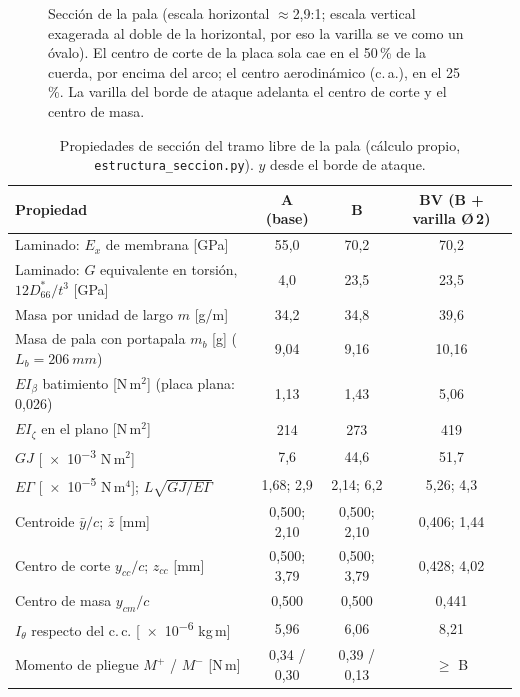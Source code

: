 \begin{figure}[H]
\caption{Sección de la pala (escala horizontal $\approx$2,9:1; escala vertical exagerada al
doble de la horizontal, por eso la varilla se ve como un óvalo).
El centro de corte de la placa sola cae en el 50\,\% de la cuerda, por encima del arco;
el centro aerodinámico (c.\,a.), en el 25\,\%. La varilla del borde de ataque adelanta el
centro de corte y el centro de masa.}
\label{fig:estructura-seccion}
\end{figure}

\begin{table}[H]
\centering\small
\caption[Propiedades de sección del tramo libre de la pala]{Propiedades de sección del tramo libre de la pala (cálculo propio,
\texttt{estructura\_seccion.py}). $y$ desde el borde de ataque.}\label{tab:estructura-seccion}
\begin{tabular}{@{}lccc@{}}
\toprule
\textbf{Propiedad} & \textbf{A (base)} & \textbf{B} & \textbf{BV (B + varilla Ø\,2)}\\\midrule
Laminado: $E_x$ de membrana [GPa]            & 55,0 & 70,2 & 70,2\\
Laminado: $G$ equivalente en torsión, $12D_{66}^*/t^3$ [GPa] & 4,0 & 23,5 & 23,5\\
Masa por unidad de largo $m$ [g/m]           & 34,2 & 34,8 & 39,6\\
Masa de pala con portapala $m_b$ [g] ($L_b=\SI{206}{mm}$) & 9,04 & 9,16 & 10,16\\
$EI_\beta$ batimiento [N\,m$^2$] (placa plana: 0,026) & 1,13 & 1,43 & 5,06\\
$EI_\zeta$ en el plano [N\,m$^2$]             & 214 & 273 & 419\\
$GJ$ [\num{e-3} N\,m$^2$]                     & 7,6 & 44,6 & 51,7\\
$E\Gamma$ [\num{e-5} N\,m$^4$]; $L\sqrt{GJ/E\Gamma}$ & 1,68; 2,9 & 2,14; 6,2 & 5,26; 4,3\\
Centroide $\bar y/c$; $\bar z$ [mm]            & 0,500; 2,10 & 0,500; 2,10 & 0,406; 1,44\\
Centro de corte $y_{cc}/c$; $z_{cc}$ [mm]      & 0,500; 3,79 & 0,500; 3,79 & 0,428; 4,02\\
Centro de masa $y_{cm}/c$                      & 0,500 & 0,500 & 0,441\\
$I_\theta$ respecto del c.\,c. [\num{e-6} kg\,m] & 5,96 & 6,06 & 8,21\\
Momento de pliegue $M^+$ / $M^-$ [N\,m]         & 0,34 / 0,30 & 0,39 / 0,13 & $\ge$ B\\
\bottomrule
\end{tabular}
\end{table}

